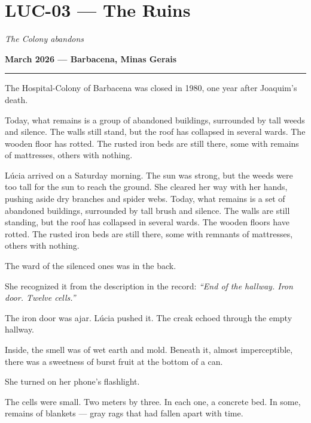 \section*{\textbf{LUC-03} --- The Ruins}

\noindent \textit{The Colony abandons}

\noindent \textbf{March 2026 --- Barbacena, Minas Gerais}

\vspace{0.5em}\noindent\rule{\textwidth}{0.5pt}\vspace{0.5em}

\noindent The Hospital-Colony of Barbacena was closed in 1980, one year after Joaquim's death.

\noindent Today, what remains is a group of abandoned buildings, surrounded by tall weeds and silence. The walls still stand, but the roof has collapsed in several wards. The wooden floor has rotted. The rusted iron beds are still there, some with remains of mattresses, others with nothing.

\noindent Lúcia arrived on a Saturday morning. The sun was strong, but the weeds were too tall for the sun to reach the ground. She cleared her way with her hands, pushing aside dry branches and spider webs.
\noindent Today, what remains is a set of abandoned buildings, surrounded by tall brush and silence. The walls are still standing, but the roof has collapsed in several wards. The wooden floors have rotted. The rusted iron beds are still there, some with remnants of mattresses, others with nothing.

\noindent The ward of the silenced ones was in the back.

\noindent She recognized it from the description in the record: \textit{\textquotedblleft{}End of the hallway. Iron door. Twelve cells.\textquotedblright{}}

\noindent The iron door was ajar. Lúcia pushed it. The creak echoed through the empty hallway.

\noindent Inside, the smell was of wet earth and mold. Beneath it, almost imperceptible, there was a sweetness of burst fruit at the bottom of a can.

\noindent She turned on her phone's flashlight.

\noindent The cells were small. Two meters by three. In each one, a concrete bed. In some, remains of blankets --- gray rags that had fallen apart with time.

